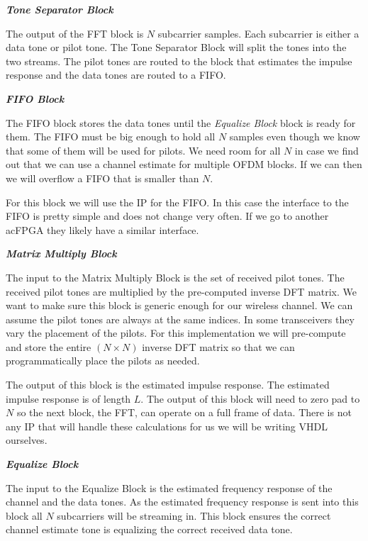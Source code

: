 {\bf \emph{Tone Separator Block}}

The output of the \ac{FFT} block is $N$ subcarrier samples. Each subcarrier is either a data tone or pilot tone. The Tone Separator Block will split the tones into the two streams. The pilot tones are routed to the block that estimates the impulse response and the data tones are routed to a \ac{FIFO}.

{\bf \emph{\ac{FIFO} Block}}

The \ac{FIFO} block stores the data tones until the \emph{Equalize Block} block is ready for them. The \ac{FIFO} must be big enough to hold all $N$ samples even though we know that some of them will be used for pilots. We need room for all $N$ in case we find out that we can use a channel estimate for multiple \ac{OFDM} blocks. If we can then we will overflow a \ac{FIFO} that is smaller than $N$.

For this block we will use the \ac{IP} for the \ac{FIFO}. In this case the interface to the \ac{FIFO} is pretty simple and does not change very often. If we go to another ac{FPGA} they likely have a similar interface.

{\bf \emph{Matrix Multiply Block}}

The input to the Matrix Multiply Block is the set of received pilot tones. The received pilot tones are multiplied by the pre-computed inverse \ac{DFT} matrix. We want to make sure this block is generic enough for our wireless channel. We can assume the pilot tones are always at the same indices. In some transceivers they vary the placement of the pilots. For this implementation we will pre-compute and store the entire $(N\times N)$ inverse \ac{DFT} matrix so that we can programmatically place the pilots as needed.

The output of this block is the estimated impulse response. The estimated impulse response is of length $L$. The output of this block will need to zero pad to $N$ so the next block, the \ac{FFT}, can operate on a full frame of data. There is not any \ac{IP} that will handle these calculations for us we will be writing \ac{VHDL} ourselves.

{\bf \emph{Equalize Block}}

The input to the Equalize Block is the estimated frequency response of the channel and the data tones. As the estimated frequency response is sent into this block all $N$ subcarriers will be streaming in. This block ensures the correct channel estimate tone is equalizing the correct received data tone.

